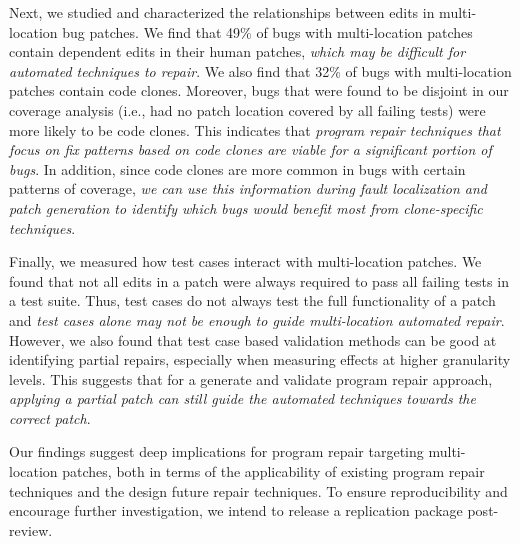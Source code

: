 \documentclass[sigconf, timestamp-false, anonymous=true]{acmart}
\begin{document}
Next, we studied and characterized the relationships between edits in
multi-location bug patches. We find that 49\% of bugs with multi-location
patches contain dependent edits in their human patches, \emph{which may be
  difficult for automated techniques to repair}.  We also find that 32\% of bugs
with multi-location patches contain code clones. Moreover, bugs
that were found to be disjoint in our coverage analysis (i.e., had no
patch location covered by all failing tests) were more likely to be code
clones. This indicates that \emph{program repair techniques that focus on fix
  patterns based on code clones are viable for a significant portion of
  bugs}. In addition, since code clones are more common in bugs with certain
patterns of coverage, \emph{we can use this information during fault localization and
patch generation to identify which bugs would benefit most from clone-specific techniques}.

Finally, we measured how test cases interact with multi-location patches.  We
found that not all edits in a patch were always required to pass all failing
tests in a test suite. Thus, test cases do not always test the full
functionality of a patch and \emph{test cases alone may not be enough to guide
  multi-location automated repair}.  However, we also found that test case based
validation methods can be good at identifying partial repairs, especially when
measuring effects at higher granularity levels. This suggests that for a generate
and validate program repair approach, \emph{applying a partial patch can still guide
the automated techniques towards the correct patch}.

Our findings suggest deep implications for program repair targeting
multi-location patches, both in terms of the applicability of existing program
repair techniques and the design future repair techniques. To ensure
reproducibility and encourage further investigation, we intend to release a
replication package post-review.



\end{document}
